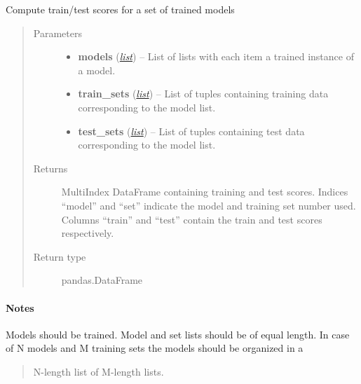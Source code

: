 \documentclass[letterpaper,10pt,english]{sphinxmanual}
\begin{document}
\begin{fulllineitems}
\label{classification:flamingo.classification.models.score_models}
Compute train/test scores for a set of trained models
\begin{quote}\begin{description}
\item[{Parameters}] \leavevmode\begin{itemize}
\item {} 
\textbf{models} (\href{http://docs.python.org/library/functions.html\#list}{\emph{list}}) -- List of lists with each item a trained instance of a model.

\item {} 
\textbf{train\_sets} (\href{http://docs.python.org/library/functions.html\#list}{\emph{list}}) -- List of tuples containing training data corresponding to the model list.

\item {} 
\textbf{test\_sets} (\href{http://docs.python.org/library/functions.html\#list}{\emph{list}}) -- List of tuples containing test data corresponding to the model list.

\end{itemize}

\item[{Returns}] \leavevmode
MultiIndex DataFrame containing training and test scores.
Indices ``model'' and ``set'' indicate the model and training set number used.
Columns ``train'' and ``test'' contain the train and test scores respectively.

\item[{Return type}] \leavevmode
pandas.DataFrame

\end{description}\end{quote}
\paragraph{Notes}

Models should be trained.
Model and set lists should be of equal length.
In case of N models and M training sets the models should be organized in a
\begin{quote}

N-length list of M-length lists.
\end{quote}


\end{fulllineitems}
\end{document}
